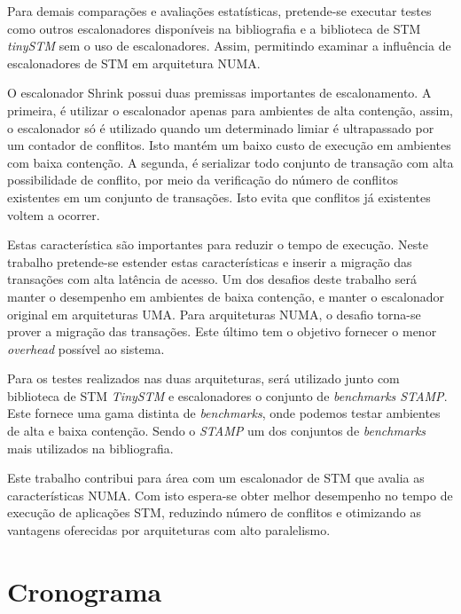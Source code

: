 \documentclass[diss-proposta,nocipinfo]{texufpel}
\begin{document}
Para demais comparações e avaliações estatísticas, pretende-se executar testes como outros escalonadores disponíveis na bibliografia e a biblioteca de STM \emph{tinySTM} sem o uso de escalonadores. Assim, permitindo examinar a influência de escalonadores de STM em arquitetura NUMA.

O escalonador Shrink possui duas premissas importantes de escalonamento. A primeira, é utilizar o escalonador apenas para ambientes de alta contenção, assim, o escalonador só é utilizado quando um determinado limiar é ultrapassado por um contador de conflitos. Isto mantém um baixo custo de execução em ambientes com baixa contenção. A segunda, é serializar todo conjunto de transação com alta possibilidade de conflito, por meio da verificação do número de conflitos existentes em um conjunto de transações. Isto evita que conflitos já existentes voltem a ocorrer.

Estas característica são importantes para reduzir o tempo de execução. Neste trabalho pretende-se estender estas características e inserir a migração das transações com alta latência de acesso. Um dos desafios deste trabalho será manter o desempenho em ambientes de baixa contenção, e manter o escalonador original em arquiteturas UMA. Para arquiteturas NUMA, o desafio torna-se prover a migração das transações. Este último tem o objetivo fornecer o menor \emph{overhead} possível ao sistema.

Para os testes realizados nas duas arquiteturas, será utilizado junto com biblioteca de STM \emph{TinySTM} e escalonadores o conjunto de \emph{benchmarks STAMP}. Este fornece uma gama distinta de \emph{benchmarks}, onde podemos testar ambientes de alta e baixa contenção. Sendo o \emph{STAMP} um dos conjuntos de \emph{benchmarks} mais utilizados na bibliografia.

Este trabalho contribui para área com um escalonador de STM que avalia as características NUMA. Com isto espera-se obter melhor desempenho no tempo de execução de aplicações STM, reduzindo número de conflitos e otimizando as vantagens oferecidas por arquiteturas com alto paralelismo.


\chapter{Cronograma}
\end{document}
